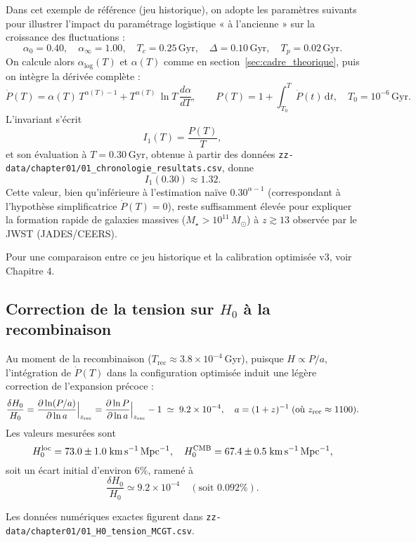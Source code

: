 Dans cet exemple de référence (jeu historique), on adopte les paramètres suivants pour illustrer l’impact du paramétrage logistique « à l’ancienne » sur la croissance des fluctuations :
\[
  \alpha_{0}=0.40,\quad
  \alpha_{\infty}=1.00,\quad
  T_{c}=0.25\,\mathrm{Gyr},\quad
  \Delta=0.10\,\mathrm{Gyr},\quad
  T_{p}=0.02\,\mathrm{Gyr}.
\]
On calcule alors \(\alpha_{\mathrm{log}}(T)\) et \(\alpha(T)\) comme en section~\ref{sec:cadre_theorique}, puis on intègre la dérivée complète :
\[
  \dot P(T)
    = \alpha(T)\,T^{\alpha(T)-1}
    + T^{\alpha(T)}\,\ln T\,\frac{d\alpha}{dT},
\qquad
  P(T)
    = 1 + \int_{T_{0}}^{T}\dot P(t)\,\mathrm{d}t,
\quad
  T_{0}=10^{-6}\,\mathrm{Gyr}.
\]
L’invariant s’écrit  
\[
  I_{1}(T)=\frac{P(T)}{T},
\]
et son évaluation à \(T=0.30\) Gyr, obtenue à partir des données  
\texttt{zz-data/chapter01/01\_chronologie\_resultats.csv}, donne
\[
  I_{1}(0.30)\approx1.32.
\]
Cette valeur, bien qu’inférieure à l’estimation naïve \(0.30^{\alpha-1}\) (correspondant à l’hypothèse simplificatrice \(\dot P(T)=0\)), reste suffisamment élevée pour expliquer la formation rapide de galaxies massives (\(M_{\star}>10^{11}\,M_{\odot}\)) à \(z\gtrsim13\) observée par le JWST (JADES/CEERS).

Pour une comparaison entre ce jeu historique et la calibration optimisée v3, voir Chapitre 4.

\subsection{Correction de la tension sur \(H_{0}\) à la recombinaison}

Au moment de la recombinaison (\(T_{\mathrm{rec}}\approx3.8\times10^{-4}\) Gyr),  
puisque \(H\propto P/a\), l’intégration de \(\dot P(T)\) dans la configuration optimisée induit une légère correction de l’expansion précoce :
\[
  \frac{\delta H_{0}}{H_{0}}
  =\Bigl.\frac{\partial\ln(P/a)}{\partial\ln a}\Bigr|_{z_{\rm rec}}
  =\Bigl.\frac{\partial\ln P}{\partial\ln a}\Bigr|_{z_{\rm rec}} -1
  \;\simeq\;9.2\times10^{-4},
  \quad
  a=(1+z)^{-1}\;(\text{où }z_{\rm rec}\approx1100).
\]
Les valeurs mesurées sont  
\[
  H_{0}^{\rm loc}=73.0\pm1.0\;\mathrm{km\,s^{-1}\,Mpc^{-1}},
  \quad
  H_{0}^{\rm CMB}=67.4\pm0.5\;\mathrm{km\,s^{-1}\,Mpc^{-1}},
\]
soit un écart initial d’environ \(6\%\), ramené à  
\[
  \frac{\delta H_{0}}{H_{0}}\simeq9.2\times10^{-4}
  \quad(\text{soit }0.092\%).
\]

Les données numériques exactes figurent dans  
\texttt{zz-data/chapter01/01\_H0\_tension\_MCGT.csv}.  

